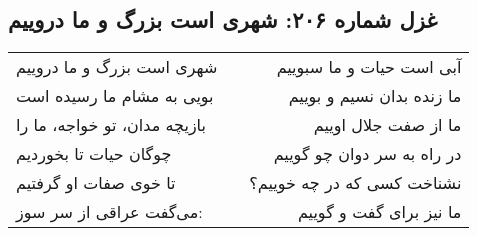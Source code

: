 \begin{center}
\section*{غزل شماره ۲۰۶: شهری است بزرگ و ما دروییم}
\label{sec:206}
\begin{longtable}{l p{0.5cm} r}
شهری است بزرگ و ما دروییم
&&
آبی است حیات و ما سبوییم
\\
بویی به مشام ما رسیده است
&&
ما زنده بدان نسیم و بوییم
\\
بازیچه مدان، تو خواجه، ما را
&&
ما از صفت جلال اوییم
\\
چوگان حیات تا بخوردیم
&&
در راه به سر دوان چو گوییم
\\
تا خوی صفات او گرفتیم
&&
نشناخت کسی که در چه خوییم؟
\\
می‌گفت عراقی از سر سوز:
&&
ما نیز برای گفت و گوییم
\\
\end{longtable}
\end{center}
